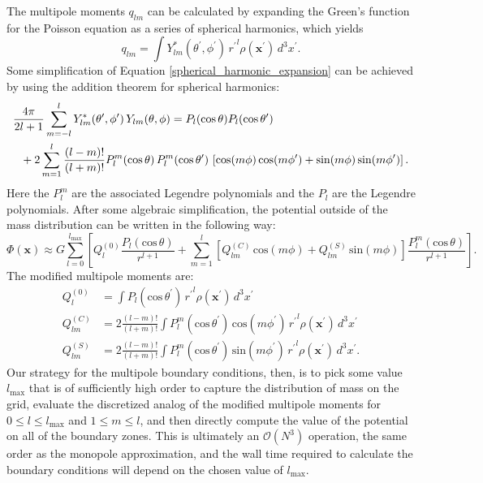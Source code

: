 \begin{itemize}
The multipole moments $q_{lm}$ can be calculated by expanding the
Green's function for the Poisson equation as a series of spherical
harmonics, which yields
\begin{equation}
  q_{lm} = \int Y^*_{lm}(\theta^\prime, \phi^\prime)\, {r^\prime}^l \rho(\mathbf{x}^\prime)\, d^3x^\prime. \label{multipole_moments_original}
\end{equation}
Some simplification of Equation \ref{spherical_harmonic_expansion} can
be achieved by using the addition theorem for spherical harmonics:
\begin{align}
  &\frac{4\pi}{2l+1} \sum_{m=-l}^{l} Y^*_{lm}(\theta^\prime,\phi^\prime)\, Y_{lm}(\theta, \phi) = P_l(\text{cos}\, \theta) P_l(\text{cos}\, \theta^\prime) \notag \\
  &\ \ + 2 \sum_{m=1}^{l} \frac{(l-m)!}{(l+m)!} P_{l}^{m}(\text{cos}\, \theta)\, P_{l}^{m}(\text{cos}\, \theta^\prime)\, \left[\text{cos}(m\phi)\, \text{cos}(m\phi^\prime) + \text{sin}(m\phi)\, \text{sin}(m\phi^\prime)\right].
\end{align}
Here the $P_{l}^{m}$ are the associated Legendre polynomials and the
$P_l$ are the Legendre polynomials. After some algebraic
simplification, the potential outside of the mass distribution can be
written in the following way:
\begin{equation}
  \Phi(\mathbf{x}) \approx G\sum_{l=0}^{l_{\text{max}}} \left[Q_l^{(0)} \frac{P_l(\text{cos}\, \theta)}{r^{l+1}} + \sum_{m = 1}^{l}\left[ Q_{lm}^{(C)}\, \text{cos}(m\phi) + Q_{lm}^{(S)}\, \text{sin}(m\phi)\right] \frac{P_{l}^{m}(\text{cos}\, \theta)}{r^{l+1}} \right].
\end{equation}
The modified multipole moments are:
\begin{align}
  Q_l^{(0)}   &= \int P_l(\text{cos}\, \theta^\prime)\, {r^{\prime}}^l \rho(\mathbf{x}^\prime)\, d^3 x^\prime \\
  Q_{lm}^{(C)} &= 2\frac{(l-m)!}{(l+m)!} \int P_{l}^{m}(\text{cos}\, \theta^\prime)\, \text{cos}(m\phi^\prime)\, {r^\prime}^l \rho(\mathbf{x}^\prime)\, d^3 x^\prime \\
  Q_{lm}^{(S)} &= 2\frac{(l-m)!}{(l+m)!} \int P_{l}^{m}(\text{cos}\, \theta^\prime)\, \text{sin}(m\phi^\prime)\, {r^\prime}^l \rho(\mathbf{x}^\prime)\, d^3 x^\prime.
\end{align}
Our strategy for the multipole boundary conditions, then, is to pick
some value $l_{\text{max}}$ that is of sufficiently high order to
capture the distribution of mass on the grid, evaluate the discretized
analog of the modified multipole moments for $0 \leq l \leq
l_{\text{max}}$ and $1 \leq m \leq l$, and then directly compute the
value of the potential on all of the boundary zones. This is
ultimately an $\mathcal{O}(N^3)$ operation, the same order as the
monopole approximation, and the wall time required to calculate the
boundary conditions will depend on the chosen value of
$l_{\text{max}}$.


\end{itemize}
